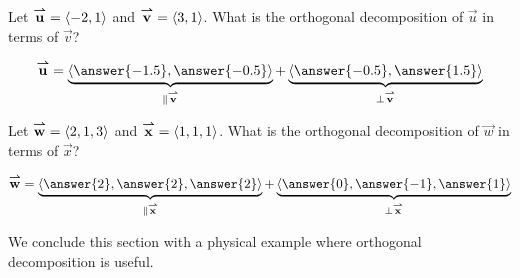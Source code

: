 \documentclass{ximera}
\begin{document}
\begin{question}
Let ${\overset{\boldsymbol{\rightharpoonup}}{\mathbf{u}}} = \left\langle -2,1\right\rangle$ and ${\overset{\boldsymbol{\rightharpoonup}}{\mathbf{v}}} = \left\langle 3,1\right\rangle$.  What is the
orthogonal decomposition of $\vec{u}$ in terms of $\vec{v}$?
\begin{prompt}
\[
\vec u= \underbrace{\vector{\answer{-1.5},\answer{-0.5}}}_{\parallel \vec v} + \underbrace{\vector{\answer{-0.5},\answer{1.5}}}_{\perp \vec v}
\]
\end{prompt}
\begin{question}
  Let ${\overset{\boldsymbol{\rightharpoonup}}{\mathbf{w}}} =\left\langle 2,1,3\right\rangle$ and ${\overset{\boldsymbol{\rightharpoonup}}{\mathbf{x}}}  =\left\langle  1,1,1\right\rangle$. What is the
  orthogonal decomposition of $\vec{w}$ in terms of $\vec{x}$?
  \begin{prompt}
  \[
  \vec w  = \underbrace{\vector{\answer{2},\answer{2},\answer{2}}}_{\parallel \vec x} + \underbrace{\vector{ \answer{0},\answer{-1},\answer{1}}}_{\perp\vec x}
  \]
  \end{prompt}
\end{question}
\end{question}


We conclude this section with a physical example where orthogonal decomposition is useful.
\end{document}
